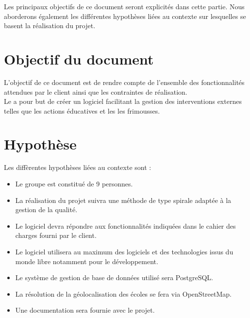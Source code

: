 	Les principaux objectifs de ce document seront explicités dans cette partie. Nous aborderons également les différentes hypothèses liées au contexte sur lesquelles se basent la réalisation du projet.


\section{Objectif du document}
	L'objectif de ce document est de rendre compte de l'ensemble des fonctionnalités attendues par le client ainsi que les contraintes de réalisation. \\
	
	Le \PICCourt \nomClient{} a pour but de créer un logiciel facilitant la gestion des interventions externes telles que les actions éducatives et les les frimousses.
	
	
\section{Hypothèse}
	Les diffèrentes hypothèses liées au contexte sont :
	\begin{itemize}
		\item Le groupe \nomEquipe{} est constitué de 9 personnes.
		\item La réalisation du projet suivra une méthode de type spirale adaptée à la gestion de la qualité.
		\item Le logiciel devra répondre aux fonctionnalités indiquées dans le cahier des charges fourni par le client.
		\item Le logiciel utilisera au maximum des logiciels et des technologies issus du monde libre notamment pour le développement.
		\item Le système de gestion de base de données utilisé sera PostgreSQL.
		\item La résolution de la géolocalisation des écoles se fera via OpenStreetMap.
		\item Une documentation sera fournie avec le projet.
	\end{itemize}
	
